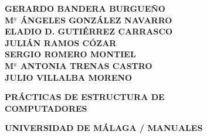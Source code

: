 \documentclass[12pt,a4paper]{book} %
\begin{document}
\frontmatter

\thispagestyle{empty}

\begin{center}
\small \bf
 GERARDO BANDERA BURGUEÑO \\[0.1cm]
 M$^{\underline{a}}$ ÁNGELES GONZÁLEZ NAVARRO \\[0.1cm]
 ELADIO D. GUTIÉRREZ CARRASCO \\[0.1cm]
 JULIÁN RAMOS CÓZAR \\[0.1cm]
 SERGIO ROMERO MONTIEL \\[0.1cm]
 M$^{\underline{a}}$ ANTONIA TRENAS CASTRO \\[0.1cm]
 JULIO VILLALBA MORENO\\[0.1cm]

\vfill

{\Large \bf PRÁCTICAS DE ESTRUCTURA DE \\[0.1cm] COMPUTADORES}

\vfill

\vfill

{\normalsize \bf UNIVERSIDAD DE MÁLAGA / MANUALES}
\end{center}






\mainmatter












\appendix









\backmatter


\end{document}
